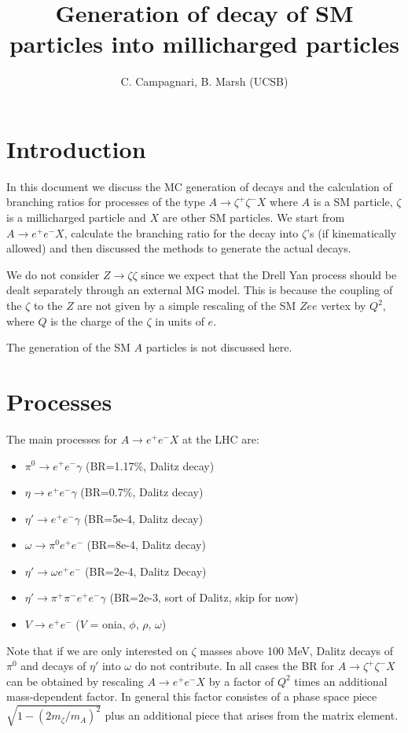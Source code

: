 \documentclass[12pt]{article}
\title{Generation of decay of SM particles into millicharged particles}
\author{C. Campagnari, B. Marsh (UCSB)}
\begin{document}
\maketitle


\section{Introduction}
In this document we discuss the MC generation of decays and
the calculation of branching ratios for processes
of the type $A \to \zeta^+ \zeta^- X$ where
$A$ is a SM particle, $\zeta$ is a millicharged particle and $X$ are
other SM particles.  We start from $A \to e^+ e^- X$,
calculate the branching ratio for the decay into $\zeta$'s (if kinematically
allowed) and then discussed the methods to generate the actual decays.

We do not consider $Z \to \zeta \zeta$ since we expect that the Drell
Yan process should be dealt separately through an external MG model.
This is because the coupling of the $\zeta$ to the $Z$ are not given by
a simple rescaling of the SM $Zee$ vertex by $Q^2$, where $Q$ is the
charge of the $\zeta$ in units of $e$.

The generation of the SM $A$ particles is not discussed here.

\section{Processes}

The main processes for  $A \to e^+ e^- X$ at the LHC are:
\begin{itemize}
    \item $\pi^0 \to e^+ e^- \gamma$  (BR=1.17\%, Dalitz decay)
    \item $\eta \to e^+ e^- \gamma$   (BR=0.7\%, Dalitz decay)
    \item $\eta' \to e^+ e^- \gamma$   (BR=5e-4, Dalitz decay)
    \item $\omega \to \pi^0 e^+ e^-$  (BR=8e-4, Dalitz decay)
    \item $\eta' \to \omega e^+ e^-$ (BR=2e-4, Dalitz Decay)
    \item $\eta' \to \pi^+ \pi^- e^+ e^- \gamma$ (BR=2e-3, sort of Dalitz, skip for now)
    \item $V \to e^+ e^-$ ($V$ = onia, $\phi$, $\rho$, $\omega$)
\end{itemize}

Note that if we are only interested on $\zeta$ masses above 100 MeV,
Dalitz decays of $\pi^0$ and decays of $\eta'$ into $\omega$
do not contribute.
In all cases the BR for $A \to \zeta^+ \zeta^- X$ can be obtained
by rescaling $A \to e^+ e^- X$ by a factor of $Q^2$ times an
additional mass-dependent factor.  In general this factor consistes
of a phase space piece $\sqrt{1 - (2m_\zeta/m_A)^2}$ plus an additional
piece that arises from the matrix element.
\end{document}
